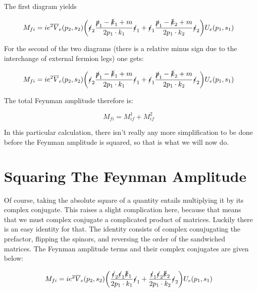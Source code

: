 \documentclass[a4]{article}
\begin{document}
    The first diagram yields

    \begin{equation}
        M_{fi} = i e^2 \overline{V}_e (p_2, s_2) \bigg( \slashed{\epsilon}_2 \frac{\slashed{p}_1 - \slashed{k}_1 + m}{2 p_1 \cdot k_1} \slashed{\epsilon}_1  + \slashed{\epsilon}_1 \frac{\slashed{p}_1 - \slashed{k}_2 + m}{2 p_1 \cdot k_2} \slashed{\epsilon}_2 \bigg) U_e (p_1, s_1)
    \end{equation}

    For the second of the two diagrams (there is a relative minus sign due to the interchange of external fermion legs) one gets:

    \begin{equation}
        M_{fi} = i e^2 \overline{V}_e (p_2, s_2) \bigg( \slashed{\epsilon}_2 \frac{\slashed{p}_1 - \slashed{k}_1 + m}{2 p_1 \cdot k_1} \slashed{\epsilon}_1  + \slashed{\epsilon}_1 \frac{\slashed{p}_1 - \slashed{k}_2 + m}{2 p_1 \cdot k_2} \slashed{\epsilon}_2 \bigg) U_e (p_1, s_1)
    \end{equation}

    The total Feynman amplitude therefore is:

    \begin{equation}
        M_{fi} = M_{if}^1 + M_{if}^2
    \end{equation}

    In this particular calculation, there isn't really any more simplification to be done before the Feynman amplitude is squared, so that is what we will now do.

    \section*{Squaring The Feynman Amplitude}

    Of course, taking the absolute square of a quantity entails multiplying it by its complex conjugate. This raises a slight complication here, because that means that we must complex conjugate a complicated product of matrices. Luckily there is an easy identity for that. The identity
    consists of complex conujugating the prefactor, flipping the spinors, and reversing the order of the sandwiched matrices. The Feynman amplitude terms and their complex conjugates are given below:

    \begin{equation}
        M_{fi} = i e^2 \overline{V}_e (p_2, s_2) \bigg( \frac{\slashed{\epsilon}_2 \slashed{\epsilon}_1 \slashed{k}_1}{2 p_1 \cdot k_1} \slashed{\epsilon}_1  + \frac{\slashed{\epsilon}_1 \slashed{\epsilon}_2 \slashed{k}_2}{2 p_1 \cdot k_2} \slashed{\epsilon}_2 \bigg) U_e (p_1, s_1)
    \end{equation}
\end{document}
